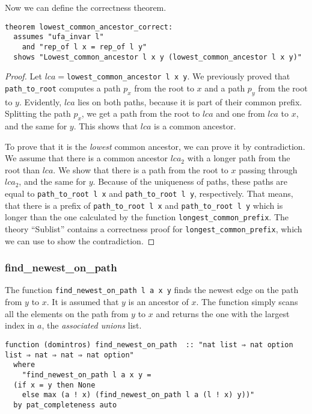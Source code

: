 Now we can define the correctness theorem.

\begin{lstlisting}
theorem lowest_common_ancestor_correct:
  assumes "ufa_invar l"
    and "rep_of l x = rep_of l y"
  shows "Lowest_common_ancestor l x y (lowest_common_ancestor l x y)"
\end{lstlisting}

\begin{proof}
Let $lca =$\lstinline{lowest_common_ancestor l x y}. We previously proved that \lstinline{path_to_root} computes a path $p_x$ from the root to $x$ and a path $p_y$ from the root to $y$. Evidently, $lca$ lies on both paths, because it is part of their common prefix. Splitting the path $p_x$, we get a path from the root to $lca$ and one from $lca$ to $x$, and the same for $y$. This shows that $lca$ is a common ancestor.

To prove that it is the \emph{lowest} common ancestor, we can prove it by contradiction. We assume that there is a common ancestor $lca_2$ with a longer path from the root than $lca$. We show that there is a path from the root to $x$ passing through $lca_2$, and the same for $y$. Because of the uniqueness of paths, these paths are equal to \lstinline{path_to_root l x} and \lstinline{path_to_root l y}, respectively. That means, that there is a prefix of \lstinline{path_to_root l x} and \lstinline{path_to_root l y} which is longer than the one calculated by the function \lstinline{longest_common_prefix}. The theory ``Sublist'' contains a correctness proof for \lstinline{longest_common_prefix}, which we can use to show the contradiction.
\end{proof}

\subsubsection{find\_newest\_on\_path}

The function \lstinline{find_newest_on_path l a x y} finds the newest edge on the path from $y$ to $x$. It is assumed that $y$ is an ancestor of $x$. The function simply scans all the elements on the path from $y$ to $x$ and returns the one with the largest index in $a$, the \emph{associated unions} list.

\begin{lstlisting}
function (domintros) find_newest_on_path  :: "nat list ⇒ nat option list ⇒ nat ⇒ nat ⇒ nat option"
  where
    "find_newest_on_path l a x y =
  (if x = y then None
    else max (a ! x) (find_newest_on_path l a (l ! x) y))"
  by pat_completeness auto
\end{lstlisting}

